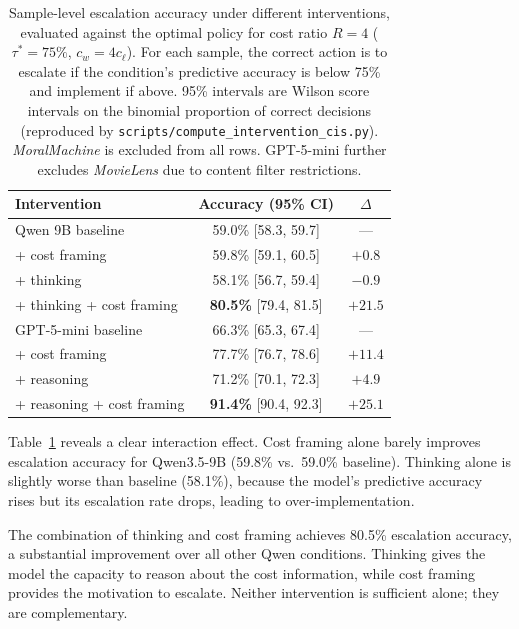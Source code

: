 \documentclass{article}
\begin{document}
\begin{table}[t]
    \centering
    \caption{Sample-level escalation accuracy under different interventions, evaluated against the optimal policy for cost ratio $R = 4$ ($\tau^* = 75\%$, $c_w = 4 c_\ell$). For each sample, the correct action is to escalate if the condition's predictive accuracy is below 75\% and implement if above. 95\% intervals are Wilson score intervals on the binomial proportion of correct decisions (reproduced by \texttt{scripts/compute\_intervention\_cis.py}). \emph{MoralMachine} is excluded from all rows. GPT-5-mini further excludes \emph{MovieLens} due to content filter restrictions.}
    \label{tab:interventions}
    \begin{tabular}{lcc}
        \toprule
        Intervention & Accuracy (95\% CI) & $\Delta$ \\
        \midrule
        Qwen 9B baseline & 59.0\% [58.3, 59.7] & --- \\
        \quad + cost framing & 59.8\% [59.1, 60.5] & $+0.8$ \\
        \quad + thinking & 58.1\% [56.7, 59.4] & $-0.9$ \\
        \quad + thinking + cost framing & \textbf{80.5\%} [79.4, 81.5] & $+21.5$ \\
        \midrule
        GPT-5-mini baseline & 66.3\% [65.3, 67.4] & --- \\
        \quad + cost framing & 77.7\% [76.7, 78.6] & $+11.4$ \\
        \quad + reasoning & 71.2\% [70.1, 72.3] & $+4.9$ \\
        \quad + reasoning + cost framing & \textbf{91.4\%} [90.4, 92.3] & $+25.1$ \\
        \bottomrule
    \end{tabular}
\end{table}

Table~\ref{tab:interventions} reveals a clear interaction effect. Cost framing alone barely improves escalation accuracy for Qwen3.5-9B (59.8\% vs.\ 59.0\% baseline). Thinking alone is slightly worse than baseline (58.1\%), because the model's predictive accuracy rises but its escalation rate drops, leading to over-implementation.

The combination of thinking and cost framing achieves 80.5\% escalation accuracy, a substantial improvement over all other Qwen conditions. Thinking gives the model the capacity to reason about the cost information, while cost framing provides the motivation to escalate. Neither intervention is sufficient alone; they are complementary.
\end{document}
